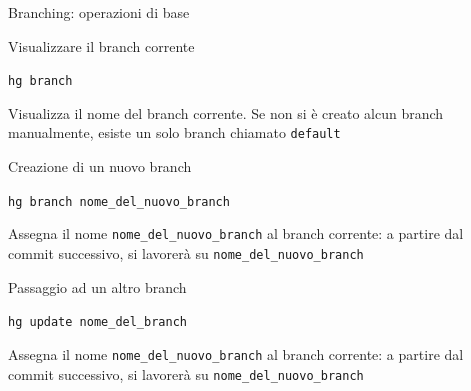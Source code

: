 \documentclass[presentation]{beamer}
\begin{document}
\begin{frame}{Branching: operazioni di base}
	\begin{block}{Visualizzare il branch corrente}
		\begin{center}
			\texttt{hg branch}
		\end{center}
		Visualizza il nome del branch corrente. Se non si è creato alcun branch manualmente, esiste un solo branch chiamato \texttt{default}
	\end{block}
	\begin{block}{Creazione di un nuovo branch}
		\begin{center}
			\texttt{hg branch nome\_del\_nuovo\_branch}
		\end{center}
		Assegna il nome \texttt{nome\_del\_nuovo\_branch} al branch corrente: a partire dal commit successivo, si lavorerà su \texttt{nome\_del\_nuovo\_branch}
	\end{block}
	\begin{block}{Passaggio ad un altro branch}
		\begin{center}
			\texttt{hg update nome\_del\_branch}
		\end{center}
		Assegna il nome \texttt{nome\_del\_nuovo\_branch} al branch corrente: a partire dal commit successivo, si lavorerà su \texttt{nome\_del\_nuovo\_branch}
	\end{block}
\end{frame}


\end{document}
